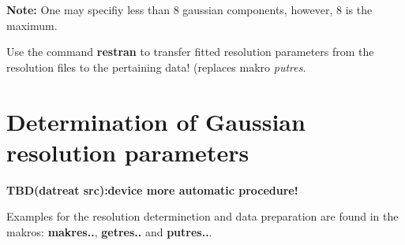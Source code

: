 \documentclass[11pt,fleqn]{book} %
\newcommand{\tbd}[1]{\vskip 0.5cm {\bf {\color{green} TBD(datreat src):#1 }} \vskip 0.5cm}
\begin{document}
{\bf Note:} One may specifiy less than 8 gaussian components, however, 8 is the maximum.

\begin{exercise}
Use the command \textbf{restran} to transfer fitted resolution parameters from the
resolution files to the pertaining data! (replaces makro \textit{putres}.
\end{exercise}


\section{Determination of Gaussian resolution parameters}

\tbd{device more automatic procedure!}


Examples for the resolution determinetion and data preparation are found
in the makros: {\bf makres..}, {\bf getres..} and {\bf putres..}.
\end{document}
